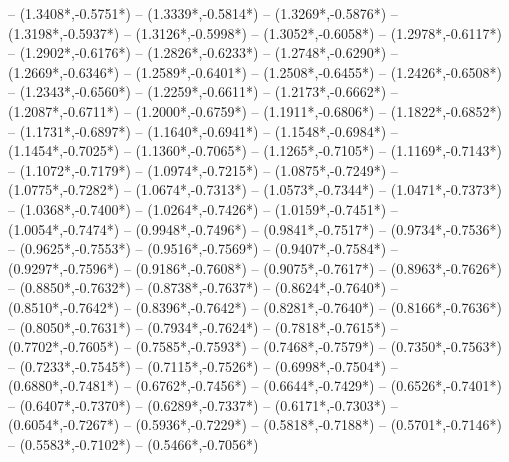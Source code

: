 {	-- ({1.3408*\dx},{-0.5751*\dy})
	-- ({1.3339*\dx},{-0.5814*\dy})
	-- ({1.3269*\dx},{-0.5876*\dy})
	-- ({1.3198*\dx},{-0.5937*\dy})
	-- ({1.3126*\dx},{-0.5998*\dy})
	-- ({1.3052*\dx},{-0.6058*\dy})
	-- ({1.2978*\dx},{-0.6117*\dy})
	-- ({1.2902*\dx},{-0.6176*\dy})
	-- ({1.2826*\dx},{-0.6233*\dy})
	-- ({1.2748*\dx},{-0.6290*\dy})
	-- ({1.2669*\dx},{-0.6346*\dy})
	-- ({1.2589*\dx},{-0.6401*\dy})
	-- ({1.2508*\dx},{-0.6455*\dy})
	-- ({1.2426*\dx},{-0.6508*\dy})
	-- ({1.2343*\dx},{-0.6560*\dy})
	-- ({1.2259*\dx},{-0.6611*\dy})
	-- ({1.2173*\dx},{-0.6662*\dy})
	-- ({1.2087*\dx},{-0.6711*\dy})
	-- ({1.2000*\dx},{-0.6759*\dy})
	-- ({1.1911*\dx},{-0.6806*\dy})
	-- ({1.1822*\dx},{-0.6852*\dy})
	-- ({1.1731*\dx},{-0.6897*\dy})
	-- ({1.1640*\dx},{-0.6941*\dy})
	-- ({1.1548*\dx},{-0.6984*\dy})
	-- ({1.1454*\dx},{-0.7025*\dy})
	-- ({1.1360*\dx},{-0.7065*\dy})
	-- ({1.1265*\dx},{-0.7105*\dy})
	-- ({1.1169*\dx},{-0.7143*\dy})
	-- ({1.1072*\dx},{-0.7179*\dy})
	-- ({1.0974*\dx},{-0.7215*\dy})
	-- ({1.0875*\dx},{-0.7249*\dy})
	-- ({1.0775*\dx},{-0.7282*\dy})
	-- ({1.0674*\dx},{-0.7313*\dy})
	-- ({1.0573*\dx},{-0.7344*\dy})
	-- ({1.0471*\dx},{-0.7373*\dy})
	-- ({1.0368*\dx},{-0.7400*\dy})
	-- ({1.0264*\dx},{-0.7426*\dy})
	-- ({1.0159*\dx},{-0.7451*\dy})
	-- ({1.0054*\dx},{-0.7474*\dy})
	-- ({0.9948*\dx},{-0.7496*\dy})
	-- ({0.9841*\dx},{-0.7517*\dy})
	-- ({0.9734*\dx},{-0.7536*\dy})
	-- ({0.9625*\dx},{-0.7553*\dy})
	-- ({0.9516*\dx},{-0.7569*\dy})
	-- ({0.9407*\dx},{-0.7584*\dy})
	-- ({0.9297*\dx},{-0.7596*\dy})
	-- ({0.9186*\dx},{-0.7608*\dy})
	-- ({0.9075*\dx},{-0.7617*\dy})
	-- ({0.8963*\dx},{-0.7626*\dy})
	-- ({0.8850*\dx},{-0.7632*\dy})
	-- ({0.8738*\dx},{-0.7637*\dy})
	-- ({0.8624*\dx},{-0.7640*\dy})
	-- ({0.8510*\dx},{-0.7642*\dy})
	-- ({0.8396*\dx},{-0.7642*\dy})
	-- ({0.8281*\dx},{-0.7640*\dy})
	-- ({0.8166*\dx},{-0.7636*\dy})
	-- ({0.8050*\dx},{-0.7631*\dy})
	-- ({0.7934*\dx},{-0.7624*\dy})
	-- ({0.7818*\dx},{-0.7615*\dy})
	-- ({0.7702*\dx},{-0.7605*\dy})
	-- ({0.7585*\dx},{-0.7593*\dy})
	-- ({0.7468*\dx},{-0.7579*\dy})
	-- ({0.7350*\dx},{-0.7563*\dy})
	-- ({0.7233*\dx},{-0.7545*\dy})
	-- ({0.7115*\dx},{-0.7526*\dy})
	-- ({0.6998*\dx},{-0.7504*\dy})
	-- ({0.6880*\dx},{-0.7481*\dy})
	-- ({0.6762*\dx},{-0.7456*\dy})
	-- ({0.6644*\dx},{-0.7429*\dy})
	-- ({0.6526*\dx},{-0.7401*\dy})
	-- ({0.6407*\dx},{-0.7370*\dy})
	-- ({0.6289*\dx},{-0.7337*\dy})
	-- ({0.6171*\dx},{-0.7303*\dy})
	-- ({0.6054*\dx},{-0.7267*\dy})
	-- ({0.5936*\dx},{-0.7229*\dy})
	-- ({0.5818*\dx},{-0.7188*\dy})
	-- ({0.5701*\dx},{-0.7146*\dy})
	-- ({0.5583*\dx},{-0.7102*\dy})
	-- ({0.5466*\dx},{-0.7056*\dy})
}
